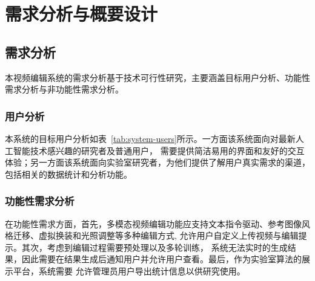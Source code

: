 \chapter{需求分析与概要设计}

\section{需求分析}
\label{sec:requirements-analysis}

本视频编辑系统的需求分析基于技术可行性研究，主要涵盖目标用户分析、功能性需求分析与非功能性需求分析。

\subsection{用户分析}

本系统的目标用户分析如表~\ref{tab:system-users}所示。一方面该系统面向对最新人工智能技术感兴趣的研究者及普通用户，
需要提供简洁易用的界面和友好的交互体验；另一方面该系统面向实验室研究者，为他们提供了解用户真实需求的渠道，
包括相关的数据统计和分析功能。


\begin{table}
    \centering
    \caption{目标用户分析}
    \label{tab:system-users}
\end{table}

\subsection{功能性需求分析}

在功能性需求方面，首先，多模态视频编辑功能应支持文本指令驱动、参考图像风格迁移、虚拟换装和光照调整等多种编辑方式,
允许用户自定义上传视频与编辑提示。其次，考虑到编辑过程需要预处理以及多轮训练，
系统无法实时的生成结果，因此需要在结果生成后通知用户并允许用户查看。最后，作为实验室算法的展示平台，系统需要
允许管理员用户导出统计信息以供研究使用。

